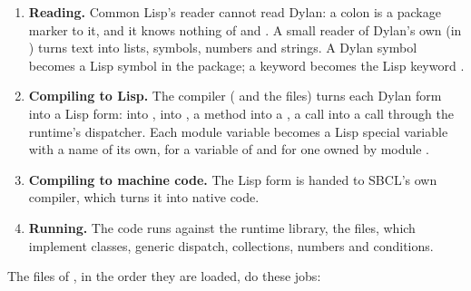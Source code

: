 \begin{enumerate}
\item \textbf{Reading.} Common Lisp's reader cannot read Dylan: a colon
  is a package marker to it, and it knows nothing of  and
  . A small reader of Dylan's own (in ) turns
  text into lists, symbols, numbers and strings. A Dylan symbol becomes a
  Lisp symbol in the  package; a keyword  becomes
  the Lisp keyword .
\item \textbf{Compiling to Lisp.} The compiler (
  and the  files) turns each Dylan form into a Lisp
  form:  into ,  into , a
  method into a , a call into a call through the runtime's
  dispatcher. Each module variable becomes a Lisp special variable
  with a name of its own,  for a variable  of
   and  for one owned by module
  .
\item \textbf{Compiling to machine code.} The Lisp form is handed to
  SBCL's own compiler, which turns it into native code.
\item \textbf{Running.} The code runs against the runtime library, the
   files, which implement classes, generic
  dispatch, collections, numbers and conditions.
\end{enumerate}

\noindent
The files of , in the order they are loaded, do these jobs:

